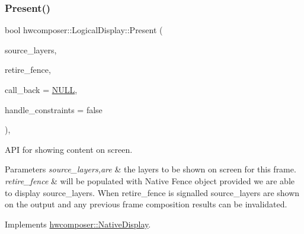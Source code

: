 \begin{DoxyCode}{0}
\end{DoxyCode}
\mbox{\label{classhwcomposer_1_1LogicalDisplay_a2cc998518219938311c9bba35cac4935}} 
\subsubsection{\texorpdfstring{Present()}{Present()}}
{\footnotesize\ttfamily bool hwcomposer\+::\+Logical\+Display\+::\+Present (\begin{DoxyParamCaption}\item[{std\+::vector$<$ \mbox{\hyperlink{structhwcomposer_1_1HwcLayer}{Hwc\+Layer}} $\ast$$>$ \&}]{source\+\_\+layers,  }\item[{int32\+\_\+t $\ast$}]{retire\+\_\+fence,  }\item[{\mbox{\hyperlink{classhwcomposer_1_1PixelUploaderCallback}{Pixel\+Uploader\+Callback}} $\ast$}]{call\+\_\+back = {\ttfamily \mbox{\hyperlink{alios_2platformdefines_8h_a070d2ce7b6bb7e5c05602aa8c308d0c4}{N\+U\+LL}}},  }\item[{bool}]{handle\+\_\+constraints = {\ttfamily false} }\end{DoxyParamCaption})\hspace{0.3cm}{\ttfamily [override]}, {\ttfamily [virtual]}}

A\+PI for showing content on screen. 
\begin{DoxyParams}{Parameters}
{\em source\+\_\+layers,are} & the layers to be shown on screen for this frame. \\
\hline
{\em retire\+\_\+fence} & will be populated with Native Fence object provided we are able to display source\+\_\+layers. When retire\+\_\+fence is signalled source\+\_\+layers are shown on the output and any previous frame composition results can be invalidated. \\
\hline
\end{DoxyParams}


Implements \mbox{\hyperlink{classhwcomposer_1_1NativeDisplay_a4825b8bc4b85e03b396ed6d2cf5bd8c0}{hwcomposer\+::\+Native\+Display}}.



